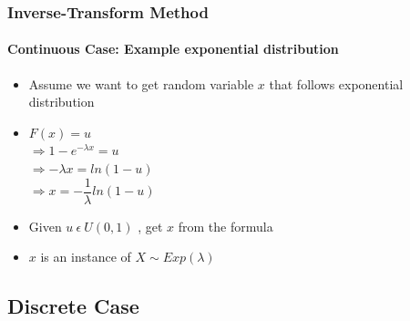 \documentclass{beamer}
\begin{document}
\begin{frame}
    \frametitle{Inverse-Transform Method}
    \framesubtitle{Continuous Case: Example exponential  distribution}
	\begin{itemize}
		\item Assume we want to get random variable $x$ that follows 						exponential distribution
		\item $F (x) = u$ \\
		$\Rightarrow 1- e^{-\lambda x} = u$ \\
		$\Rightarrow -\lambda x = ln (1-u)$ \\
		$\Rightarrow x = - \dfrac{1}{\lambda}  ln (1-u)$
	\item Given $u \: \epsilon \: U(0,1)$ , get $x$ from the formula
	\item $x $ is an instance of $X \sim Exp (\lambda)$
		  
	\end{itemize}	

\end{frame}

\subsection{Discrete Case}
\end{document}
